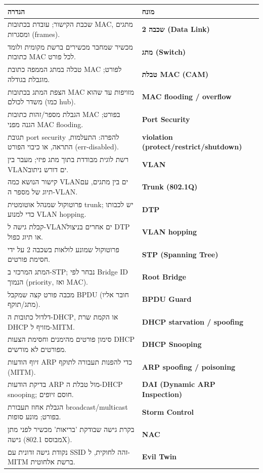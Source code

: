 \documentclass[11pt]{article}
\newcommand{\enLR}[1]{\textenglish{#1}}
\begin{document}
\begin{xltabular}{\linewidth}{|>{\setRTL\raggedleft\arraybackslash}X|>{\setRTL\raggedleft\arraybackslash}X|}
\hline
{}\textbf{הגדרה} & \textbf{מונח} \\
\hline
\endhead
שכבת הקישור; עובדת בכתובות \enLR{MAC}, מתגים ומסגרות \enLR{(frames).} & \textbf{שכבה \enLR{2 (Data Link)}} \\
\hline
מכשיר שמחבר מכשירים ברשת מקומית ולומד כתובות \enLR{MAC} לכל פורט. & \textbf{מתג \enLR{(Switch)}} \\
\hline
טבלה במתג הממפה כתובת \enLR{MAC} לפורט; מוגבלת בגודלה. & \textbf{טבלת \enLR{MAC (CAM)}} \\
\hline
הצפת המתג בכתובות \enLR{MAC} מזויפות עד שהוא משדר לכולם (כמו \enLR{hub).} & \textbf{\enLR{MAC flooding / overflow}} \\
\hline
הגבלת מספר/זהות כתובות \enLR{MAC} בפורט; הגנה מפני \enLR{MAC flooding.} & \textbf{\enLR{Port Security}} \\
\hline
תגובת \enLR{port security} להפרה: התעלמות, התראה, או כיבוי הפורט \enLR{(err-disabled).} & \textbf{\enLR{violation (protect/restrict/shutdown)}} \\
\hline
רשת לוגית מבודדת בתוך מתג פיזי; מעבר בין \enLR{VLAN}ים דורש ניתוב. & \textbf{\enLR{VLAN}} \\
\hline
קישור הנושא כמה \enLR{VLAN}ים בין מתגים, עם תיוג של מספר ה-\enLR{VLAN.} & \textbf{\enLR{Trunk (802.1Q)}} \\
\hline
פרוטוקול שמנהל אוטומטית \enLR{trunk}; יש לכבותו כדי למנוע \enLR{VLAN hopping.} & \textbf{\enLR{DTP}} \\
\hline
קבלת גישה ל-\enLR{VLAN}ים אחרים בניצול \enLR{DTP} או תיוג כפול. & \textbf{\enLR{VLAN hopping}} \\
\hline
פרוטוקול שמונע לולאות בשכבה \enLR{2} על ידי חסימת פורטים. & \textbf{\enLR{STP (Spanning Tree)}} \\
\hline
המתג המרכזי ב-\enLR{STP}; נבחר לפי \enLR{Bridge ID} הנמוך \enLR{(priority}, ואז \enLR{MAC).} & \textbf{\enLR{Root Bridge}} \\
\hline
מכבה פורט קצה שמקבל \enLR{BPDU} (חובר אליו מתג/תוקף). & \textbf{\enLR{BPDU Guard}} \\
\hline
דלדול כתובות ה-\enLR{DHCP}, או הקמת שרת \enLR{DHCP} מזויף ל-\enLR{MITM.} & \textbf{\enLR{DHCP starvation / spoofing}} \\
\hline
סימון פורטים מהימנים וחסימת הצעות \enLR{DHCP} מפורטים לא מורשים. & \textbf{\enLR{DHCP Snooping}} \\
\hline
זיוף הודעות \enLR{ARP} כדי להפנות תעבורה לתוקף \enLR{(MITM).} & \textbf{\enLR{ARP spoofing / poisoning}} \\
\hline
בדיקת הודעות \enLR{ARP} מול טבלת ה-\enLR{DHCP snooping}; חוסם זיופים. & \textbf{\enLR{DAI (Dynamic ARP Inspection)}} \\
\hline
הגבלת אחוז תעבורת \enLR{broadcast/multicast} בפורט; מונע סופות. & \textbf{\enLR{Storm Control}} \\
\hline
בקרת גישה שבודקת 'בריאות' מכשיר לפני מתן גישה (מבוסס \enLR{802.1X).} & \textbf{\enLR{NAC}} \\
\hline
נקודת גישה זדונית עם \enLR{SSID} זהה לחוקית, ל-\enLR{MITM} ברשת אלחוטית. & \textbf{\enLR{Evil Twin}} \\
\hline
\end{xltabular}
\end{document}
